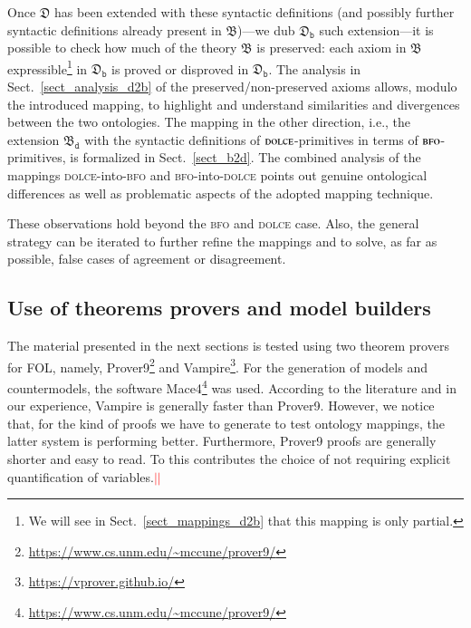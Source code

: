 \documentclass[ao]{iosart2x}
\newcommand{\nb}[1]{\textcolor{red}{$|$}\marginpar{\hspace*{-0cm}\parbox{20mm}{\scriptsize\raggedright\textcolor{red}{#1}}}}
\newcommand{\dolce}{{\textsc{dolce}}}
\newcommand{\bfo}{{\textsc{bfo}}}
\newcommand {\thdolce} {\ensuremath{\mathfrak{D}}}
\newcommand {\thbfo} {\ensuremath{\mathfrak{B}}}
\newcommand {\thbfobdmap} {\ensuremath{\mathfrak{B}_\texttt{d}}}
\newcommand {\thdolcedbmap} {\ensuremath{\mathfrak{D}_\texttt{b}}}
\begin{document}
Once {$\thdolce$} has been extended with these syntactic definitions (and possibly further syntactic definitions already present in {$\thbfo$})---we dub $\thdolcedbmap$ such extension---it is possible to check how much of the theory $\thbfo$ is preserved: each axiom in $\thbfo$ expressible\footnote{We will see in Sect.~\ref{sect_mappings_d2b} that this mapping is only partial.} in $\thdolcedbmap$ is proved or disproved in $\thdolcedbmap$. The analysis in Sect.~\ref{sect_analysis_d2b} of the preserved/non-preserved axioms allows, modulo the introduced mapping, to highlight and understand similarities and divergences between the two ontologies. The mapping in the other direction, i.e., the extension $\thbfobdmap$ with the syntactic definitions of {$\dolce$}-primitives in terms of {$\bfo$}-primitives, is formalized in Sect.~\ref{sect_b2d}. The combined analysis of the mappings {\dolce}-into-{\bfo} and {\bfo}-into-{\dolce} points out genuine ontological differences as well as problematic aspects of the adopted mapping technique. 

These observations hold beyond the {\bfo} and {\dolce} case. Also, the general strategy can be iterated to further refine the mappings and to solve, as far as possible, false cases of agreement or disagreement.

\subsection{Use of theorems provers and model builders}

The material presented in the next sections is tested using two theorem provers for FOL, namely, Prover9\footnote{\url{https://www.cs.unm.edu/~mccune/prover9/}} and Vampire\footnote{\url{https://vprover.github.io/}}. For the generation of models and countermodels, the software Mace4\footnote{\url{https://www.cs.unm.edu/~mccune/prover9/}} was used.
According to the literature \citep{Sut16} and in our experience, Vampire is generally faster than Prover9. However, we notice that, for the kind of proofs we have to generate to test ontology mappings, the latter system is performing better. Furthermore, Prover9 proofs are generally shorter and easy to read. To this contributes the choice of not requiring explicit quantification of variables.\nb{CM: non sono sicuro di capire, nel senso che non si riportano i quantificatore per le variabili univ. quantificate?}\nb{SB: ho indebolito, da ricontrollare}
\end{document}
